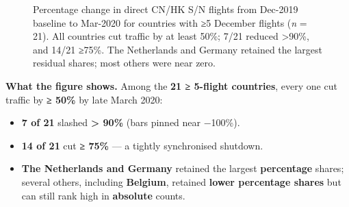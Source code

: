 \documentclass[
  authoryear,
  preprint,
  3p,
  onecolumn]{elsarticle}
\providecommand{\tightlist}{%
  \setlength{\itemsep}{0pt}\setlength{\parskip}{0pt}}\usepackage{longtable,booktabs,array}
\begin{document}
\label{cell-fig-pct_change_filtered}
\begin{figure}[H]


\caption{\label{fig-pct_change_filtered}Percentage change in direct
CN/HK S/N flights from Dec-2019 baseline to Mar-2020 for countries with
≥5 December flights (\emph{n} = 21). All countries cut traffic by at
least 50\%; 7/21 reduced \textgreater90\%, and 14/21 ≥75\%. The
Netherlands and Germany retained the largest residual shares; most
others were near zero.}

\end{figure}%

\textbf{What the figure shows.} Among the \textbf{21 ≥ 5-flight
countries}, every one cut traffic by \textbf{≥ 50\%} by late March 2020:

\begin{itemize}
\tightlist
\item
  \textbf{7 of 21} slashed \textbf{\textgreater{} 90\%} (bars pinned
  near −100\%).
\item
  \textbf{14 of 21} cut \textbf{≥ 75\%} --- a tightly synchronised
  shutdown.
\item
  \textbf{The Netherlands and Germany} retained the largest
  \textbf{percentage} shares; several others, including
  \textbf{Belgium}, retained \textbf{lower percentage shares} but can
  still rank high in \textbf{absolute} counts.
\end{itemize}
\end{document}
